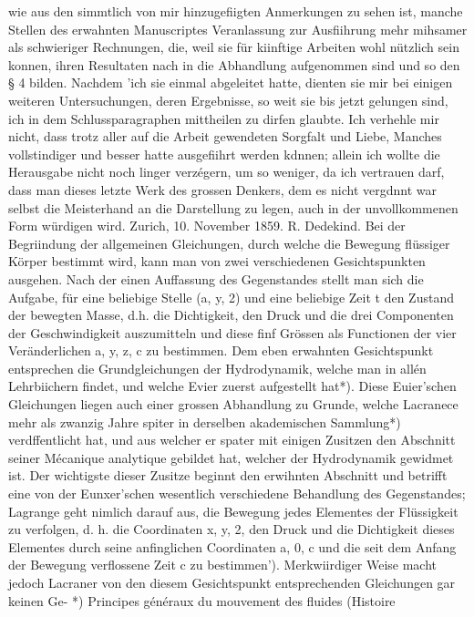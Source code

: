 \documentclass[11pt]{article}
\begin{document}
wie aus den simmtlich von mir hinzugefiigten Anmerkungen zu sehen ist, manche Stellen
des erwahnten Manuscriptes Veranlassung zur Ausfiihrung mehr mihsamer als schwieriger
Rechnungen, die, weil sie für kiinftige Arbeiten wohl nützlich sein konnen, ihren Resultaten nach in die Abhandlung aufgenommen sind und so den § 4 bilden. Nachdem ’ich sie
einmal abgeleitet hatte, dienten sie mir bei einigen weiteren Untersuchungen, deren Ergebnisse, so weit sie bis jetzt gelungen sind, ich in dem Schlussparagraphen mittheilen zu
dirfen glaubte. Ich verhehle mir nicht, dass trotz aller auf die Arbeit gewendeten Sorgfalt
und Liebe, Manches vollstindiger und besser hatte ausgefiihrt werden kdnnen; allein ich
wollte die Herausgabe nicht noch linger verzégern, um so weniger, da ich vertrauen darf,
dass man dieses letzte Werk des grossen Denkers, dem es nicht vergdnnt war selbst die
Meisterhand an die Darstellung zu legen, auch in der unvollkommenen Form würdigen
wird. Zurich, 10. November 1859. R. Dedekind.
Bei der Begriindung der allgemeinen Gleichungen, durch welche die Bewegung flüssiger Körper bestimmt wird, kann man von zwei verschiedenen Gesichtspunkten ausgehen.
Nach der einen Auffassung des Gegenstandes stellt man sich die Aufgabe, für eine beliebige Stelle (a, y, 2) und eine beliebige Zeit t den Zustand der bewegten Masse, d.h.
die Dichtigkeit, den Druck und die drei Componenten der Geschwindigkeit auszumitteln
und diese finf Grössen als Functionen der vier Veränderlichen a, y, z, c zu bestimmen.
Dem eben erwahnten Gesichtspunkt entsprechen die Grundgleichungen der Hydrodynamik, welche man in allén Lehrbiichern findet, und welche Evier zuerst aufgestellt hat*).
Diese Euier’schen Gleichungen liegen auch einer grossen Abhandlung zu Grunde, welche
Lacranece mehr als zwanzig Jahre spiter in derselben akademischen Sammlung*) verdffentlicht hat, und aus welcher er spater mit einigen Zusitzen den Abschnitt seiner Mécanique analytique gebildet hat, welcher der Hydrodynamik gewidmet ist. Der wichtigste
dieser Zusitze beginnt den erwihnten Abschnitt und betrifft eine von der Eunxer’schen
wesentlich verschiedene Behandlung des Gegenstandes; Lagrange geht nimlich darauf aus,
die Bewegung jedes Elementes der Flüssigkeit zu verfolgen, d. h. die Coordinaten x, y, 2,
den Druck und die Dichtigkeit dieses Elementes durch seine anfinglichen Coordinaten a,
0, c und die seit dem Anfang der Bewegung verflossene Zeit c zu bestimmen’). Merkwiirdiger Weise macht jedoch Lacraner von den diesem Gesichtspunkt entsprechenden
Gleichungen gar keinen Ge- *) Principes généraux du mouvement des fluides (Histoire
\end{document}
